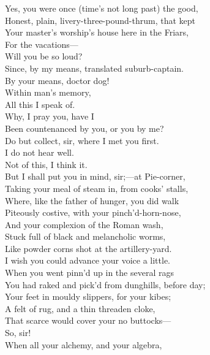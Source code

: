 \documentclass[a4paper,oneside]{memoir}
\begin{document}
\begin{drama*}
\subtlespeaks Yes, you were once (time's not long past) the good,\\
Honest, plain, livery-three-pound-thrum, that kept\\
Your master's worship's house here in the Friars,\\
For the vacations---\\
\facespeaks {} Will you be so loud?\\
\subtlespeaks Since, by my means, translated suburb-captain.\\
\facespeaks By your means, doctor dog!\\
\subtlespeaks {} Within man's memory,\\
All this I speak of.\\
\facespeaks {} Why, I pray you, have I\\
Been countenanced by you, or you by me?\\
Do but collect, sir, where I met you first.\\
\subtlespeaks I do not hear well.\\
\facespeaks {} Not of this, I think it.\\
But I shall put you in mind, sir;---at Pie-corner,\\
Taking your meal of steam in, from cooks' stalls,\\
Where, like the father of hunger, you did walk\\
Piteously costive, with your pinch'd-horn-nose,\\
And your complexion of the Roman wash,\\
Stuck full of black and melancholic worms,\\
Like powder corns shot at the artillery-yard.\\
\subtlespeaks I wish you could advance your voice a little.\\
\facespeaks When you went pinn'd up in the several rags\\
You had raked and pick'd from dunghills, before day;\\
Your feet in mouldy slippers, for your kibes;\\
A felt of rug, and a thin threaden cloke,\\
That scarce would cover your no buttocks---\\
\subtlespeaks {} So, sir!\\
\facespeaks When all your alchemy, and your algebra,\\

\end{drama*}
\end{document}
